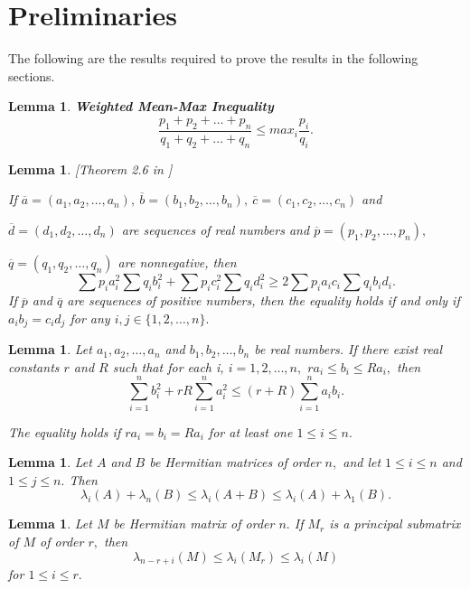 \documentclass[10pt,a4paper,oneside]{article}
\newtheorem{lemma}[theorem]{Lemma}
\begin{document}
\section{Preliminaries}
The following are the results required to prove the results in the following sections.


\begin{lemma}\label{4}\cite{25}\textbf{Weighted Mean-Max Inequality}
$$\dfrac{p_1+p_2+\ldots+p_n}{q_1+q_2+\ldots+q_n}\leq max_i \dfrac{p_i}{q_i}.$$
\end{lemma}
\begin{lemma}\label{21}[Theorem 2.6 in \cite{23}]


If $\overline{a}=(a_1,a_2,\ldots, a_n),\ \overline{b}=(b_1,b_2,\ldots,b_n),\ \overline{c}=(c_1,c_2,\ldots,c_n)$ and 


$\overline{d}=(d_1,d_2,\ldots,d_n)$ are sequences of real numbers and $\overline{p}=(p_1,p_2,\ldots,p_n),$ 


$\overline{q}=(q_1,q_2,\ldots,q_n)$ are nonnegative, then
$$\sum p_ia_i^2\sum q_ib_i^2+\sum p_ic_i^2\sum q_id_i^2\geq 2\sum p_ia_ic_i\sum q_ib_id_i.$$
If $\overline{p}$ and $\overline{q}$ are sequences of positive numbers, then the equality holds if and only if $a_ib_j=c_id_j$ for any $i,j\in \{1,2,\ldots, n\}.$
\end{lemma}
\begin{lemma}\cite{23}\label{22} Let $a_1,a_2, \ldots,a_n$ and $b_1,b_2,\ldots,b_n$ be real numbers. If there exist real constants $r$ and $R$ such that for each i, $i=1,2,\ldots,n,$ $ra_i \leq b_i\leq Ra_i,$ then
$$\sum\limits_{i=1}^{n} b_i^2+rR\sum\limits_{i=1}^{n} a_i^2 \leq (r+R)\sum\limits_{i=1}^{n} a_ib_i.$$

The equality holds if $ra_i=b_i=Ra_i$ for at least one $1\leq i \leq n.$
\end{lemma}

\begin{lemma}\cite{so1994commutativity}\label{4.1}
Let $A$ and $B$ be Hermitian matrices of order $n,$ and let $1\leq i \leq n$ and $1\leq j\leq n.$ Then
$$\lambda_i(A)+\lambda_n(B)\leq \lambda_i(A+B)\leq \lambda_i(A)+\lambda_1(B).$$
\end{lemma}

\begin{lemma}\cite{godsil2013algebraic}\label{4.2}
Let $M$ be Hermitian matrix of order $n.$ If $M_r$ is a principal submatrix of $M$ of order $r,$ then $$\lambda_{n-r+i}(M)\leq \lambda_i(M_r)\leq \lambda_i(M)$$ for $1\leq i\leq r.$
\end{lemma}
\end{document}

